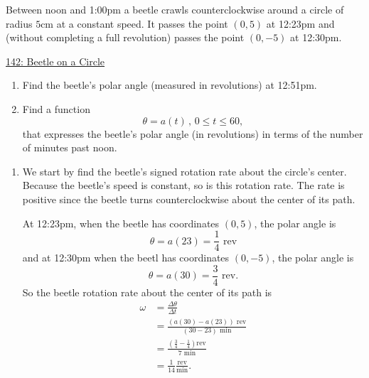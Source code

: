 \documentclass{ximera}
\begin{document}
\begin{example} \label{Ex:88df83mmaz}
Between noon and 1:00pm a beetle crawls counterclockwise around a circle of radius $5$cm at a constant speed. It passes the point $(0,5)$ at 12:23pm and (without completing a full revolution) passes the point $(0,-5)$ at 12:30pm.

\begin{onlineOnly}
    \begin{center}
\end{center}
\end{onlineOnly}

\href{https://www.desmos.com/calculator/zdwkilkten}{142: Beetle on a Circle}


\begin{enumerate}
\item Find the beetle's polar angle (measured in revolutions) at 12:51pm.

\item Find a function 
\[
 \theta =a(t) \, , \, 0\leq t \leq 60, 
\]
that expresses the beetle's polar angle (in revolutions) in terms of the number of minutes past noon.
\end{enumerate}




\begin{explanation}
\begin{enumerate}
\item We start by find the beetle's signed rotation rate about the circle's center. Because the beetle's speed is constant, so is this rotation rate. The rate is positive since the beetle turns counterclockwise about the center of its path. 

At 12:23pm, when the beetle has coordinates $(0,5)$, the polar angle is
\[
 \theta = a(23) = \frac{1}{4}\text{ rev}
\] 
and at 12:30pm when the beetl has coordinates $(0,-5)$, the polar angle is
\[
  \theta = a(30) = \frac{3}{4}\text{ rev}.
\]
So the beetle rotation rate about the center of its path is
\begin{align*}
   \omega &= \frac{\Delta \theta}{\Delta t} \\
               &= \frac{(a(30) - a(23))\text{ rev}}{(30 - 23)\text{ min}} \\
               &= \frac{\left( \frac{3}{4} - \frac{1}{4}\right) \text{rev}}{7 \text{ min}} \\
               &= \frac{1}{14} \frac{\text{rev}}{\text{min}}.
\end{align*}


\end{enumerate}
\end{explanation}
\end{example}
\end{document}
